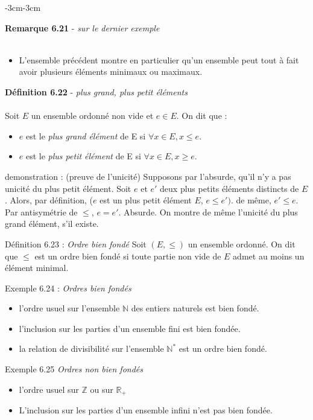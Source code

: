 \documentclass{article}
\newcommand{\notion}[1]{\textcolor{vert_fonce}{\textit{#1}}}
\newenvironment{definition}[2]
{
    \begin{boite_definition}
    \textbf{\textcolor{rouge_fonce}{Définition #1}} - \textit{#2} \\ \\
}
{
    \end{boite_definition}
    \vspace{15pt}
}
\newenvironment{remarque}[2]
{
    \begin{boite_remarque}
    \textbf{\textcolor{bleu_fonce}{Remarque #1}} - \textit{#2} \\ \\
    \begin{itemize}[label=$\blacktriangleright \quad $ ]                    
}
{   
    \end{itemize}
    \end{boite_remarque}
    
}
\begin{document}
\begin{adjustwidth}{-3cm}{-3cm}
\begin{remarque}{6.21}{sur le dernier exemple}
    \item L'ensemble précédent montre en particulier qu'un ensemble peut tout à fait avoir plusieurs éléments minimaux ou maximaux.
\end{remarque}

\begin{definition}{6.22}{plus grand, plus petit éléments}
    Soit $E$ un ensemble ordonné non vide et $e\in E$. On dit que :
    \begin{itemize}
        \item $e$ est le \notion{plus grand élément} de E si $\forall x \in E, x \leq e$.
        \item $e$ est le \notion{plus petit élément} de E si $\forall x \in E, x \geq e$.
    \end{itemize}
\end{definition}


demonstration : (preuve de l'unicité)
Supposons par l'absurde, qu'il n'y a pas unicité du plus petit élément. 
Soit $e$ et $e'$ deux plus petits éléments distincts de $E$. 
Alors, par définition, ($e$ est un plus petit élément $E$, $e \leq e')$. de même, $e' \leq e$. 
Par antisymétrie de $\leq$, $e=e'$. Absurde.
On montre de même l'unicité du plus grand élément, s'il existe.

Définition 6.23 : \textit{Ordre bien fondé}
Soit $(E,\leq)$ un ensemble ordonné.
On dit que $\leq$ est un ordre bien fondé si toute partie non vide de $E$ admet au moins un élément minimal.

Exemple 6.24 : \textit{Ordres bien fondés}
    \begin{itemize}
        \item l'ordre usuel sur l'ensemble $\mathbb{N}$ des entiers naturels est bien fondé.
        \item l'inclusion sur les parties d'un ensemble fini est bien fondée.
        \item la relation de divisibilité sur l'ensemble $\mathbb{N}^*$ est un ordre bien fondé.
    \end{itemize}

    Exemple 6.25 \textit{Ordres non bien fondés}
    \begin{itemize}
        \item l'ordre usuel sur $\mathbb{Z}$ ou sur $\mathbb{R_+}$
        \item L'inclusion sur les parties d'un ensemble infini n'est pas bien fondée.
    \end{itemize}


\end{adjustwidth}
\end{document}
